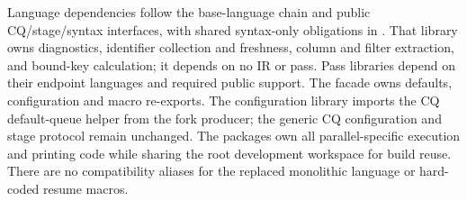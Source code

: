 Language dependencies follow the base-language chain and public CQ/stage/syntax
interfaces, with shared syntax-only obligations in .
That library owns diagnostics, identifier collection and freshness, column and
filter extraction, and bound-key calculation; it depends on no IR or pass.
Pass libraries depend on their endpoint languages and required public support.
The facade owns defaults, configuration and macro re-exports.
The configuration library imports the CQ default-queue helper from the fork
producer; the generic CQ configuration and stage protocol remain unchanged.
The  packages own all parallel-specific execution
and printing code while sharing the root development workspace for build reuse.
There are no compatibility
aliases for the replaced monolithic language or hard-coded resume macros.
